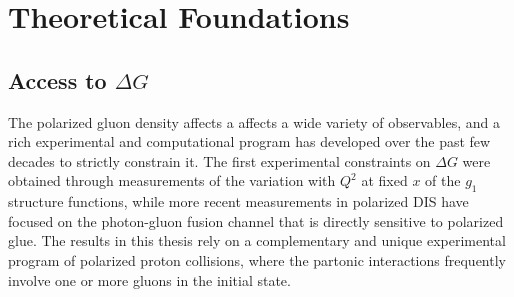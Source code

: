 \chapter{Theoretical Foundations}





\section{Access to $\Delta G$}

The polarized gluon density affects a affects a wide variety of observables,
and a rich experimental and computational program has developed over the past
few decades to strictly constrain it. The first experimental constraints on
\(\Delta G\) were obtained through measurements of the variation with \(Q^2\)
at fixed \(x\) of the \(g_1\) structure functions, while more recent
measurements in polarized DIS have focused on the photon-gluon fusion channel
that is directly sensitive to polarized glue. The results in this thesis rely
on a complementary and unique experimental program of polarized proton
collisions, where the partonic interactions frequently involve one or more
gluons in the initial state.




